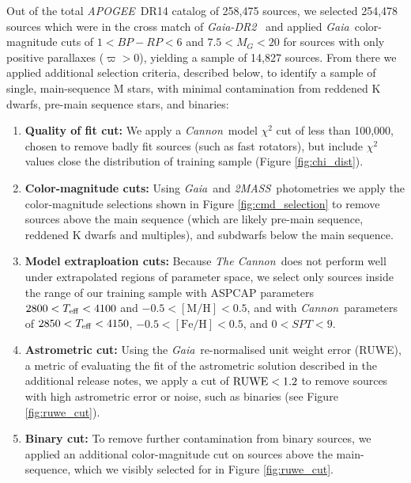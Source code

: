 \documentclass[twocolumn]{aastex62}
\newcommand{\apogee}{\textsl{APOGEE}}
\newcommand{\thecannon}{\textsl{The Cannon}}
\newcommand{\cannon}{\textsl{Cannon}}
\newcommand{\gaia}{\textsl{Gaia}}
\newcommand{\drtwo}{\textsl{Gaia-DR2}}
\newcommand{\zmass}{\textsl{2MASS}}
\newcommand{\feh}{[{\mathrm{Fe}/\mathrm{H}}]}
\newcommand{\mh}{[{\mathrm{M}/\mathrm{H}}]}
\begin{document}
Out of the total \apogee\ DR14 catalog of 258,475 sources, we selected 254,478 sources which were in the cross match of \drtwo\ \citep{Brown:2018} and applied \gaia\ color-magnitude cuts of $1<BP-RP<6$ and $7.5<M_G<20$ for sources with only positive parallaxes ($\varpi>0$), yielding a sample of 14,827 sources. From there we applied additional selection criteria, described below, to identify a sample of single, main-sequence M stars, with minimal contamination from reddened K dwarfs, pre-main sequence stars, and binaries:

\begin{enumerate}
\item \textbf{Quality of fit cut:} We apply a \cannon\ model $\chi^2$ cut of less than 100,000, chosen to remove badly fit sources (such as fast rotators), but include $\chi^2$ values close the distribution of training sample (Figure \ref{fig:chi_dist}).

\item \textbf{Color-magnitude cuts:} Using \gaia\ and \zmass\ photometries we apply the color-magnitude selections shown in Figure \ref{fig:cmd_selection} to remove sources above the main sequence (which are likely pre-main sequence, reddened K dwarfs and multiples), and subdwarfs below the main sequence.

\item \textbf{Model extraploation cuts:} Because \thecannon\ does not perform well under extrapolated regions of parameter space, we select only sources inside the range of our training sample with ASPCAP parameters $2800<T_{\rm eff}<4100$ and $-0.5<\mh<0.5$, and with \cannon\ parameters of $2850<T_{\rm eff}<4150$, $-0.5<\feh<0.5$, and $0<SPT<9$.

\item \textbf{Astrometric cut:} Using the \gaia\ re-normalised unit weight error (RUWE), a metric of evaluating the fit of the astrometric solution described in the additional release notes, we apply a cut of ${\rm RUWE}<1.2$ to remove sources with high astrometric error or noise, such as binaries (see Figure \ref{fig:ruwe_cut}).

\item \textbf{Binary cut:} To remove further contamination from binary sources, we applied an additional color-magnitude cut on sources above the main-sequence, which we visibly selected for in Figure \ref{fig:ruwe_cut}.

\end{enumerate}
\end{document}

